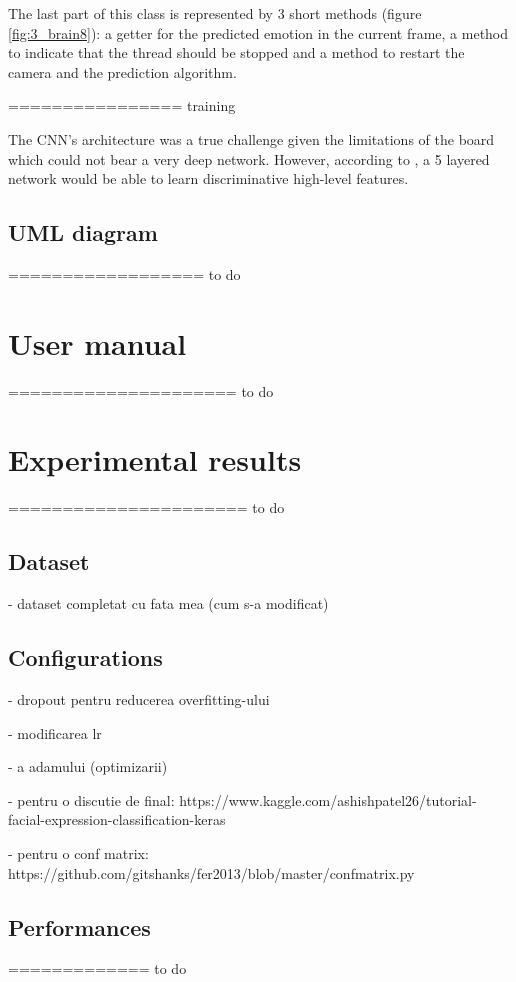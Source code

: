 \documentclass[runningheads,a4paper,12pt]{report}
\begin{document}
The last part of this class is represented by 3 short methods (figure \ref{fig:3_brain8}): a getter for the predicted emotion in the current frame, a method to indicate that the thread should be stopped and a method to restart the camera and the prediction algorithm.

================ training

The CNN's architecture was a true challenge given the limitations of the board which could not bear a very deep network. However, according to \cite{fer-cnn}, a 5 layered network would be able to learn discriminative high-level features.

\subsection*{UML diagram}

================== to do

\section{User manual}
\label{chapter:manual}
===================== to do

\section{Experimental results}
\label{chapter:results}

====================== to do

\subsection{Dataset}
\label{chapter:dataset}
- dataset completat cu fata mea (cum s-a modificat)

\subsection{Configurations}
\label{chapter:configurations}
- dropout pentru reducerea overfitting-ului

- modificarea lr

- a adamului (optimizarii)

- pentru o discutie de final: https://www.kaggle.com/ashishpatel26/tutorial-facial-expression-classification-keras

- pentru o conf matrix: https://github.com/gitshanks/fer2013/blob/master/confmatrix.py

\subsection{Performances}
\label{chapter:performances}
============= to do 
\end{document}
